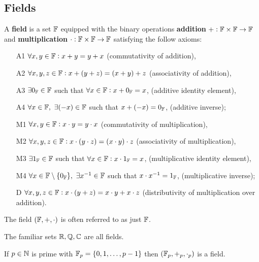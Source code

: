 \subsection{Fields}
\begin{definition}[Field]
    A \textbf{field} is a set $\mathbb{F}$ equipped with the binary operations \textbf{addition} $+:\mathbb{F}\times\mathbb{F}\rightarrow\mathbb{F}$ and \textbf{multiplication} $\cdot:\mathbb{F}\times\mathbb{F}\rightarrow\mathbb{F}$ satisfying the follow axioms:
    \begin{enumerate}
        \item[A1] $\forall x,y \in \mathbb{F}: x+y=y+x$ (commutativity of addition),
        \item[A2] $\forall x,y,z \in \mathbb{F}: x+(y+z)=(x+y)+z$ (associativity of addition),
        \item[A3] $\exists 0_{\mathbb{F}} \in \mathbb{F}$ such that $\forall x\in\mathbb{F}: x + 0_{\mathbb{F}} = x$, (additive identity element),
        \item[A4] $\forall x\in\mathbb{F}, \ \exists (-x)\in\mathbb{F}$ such that $x+(-x)=0_{\mathbb{F}}$, (additive inverse);
        
        \item[M1] $\forall x,y \in \mathbb{F}: x\cdot y=y\cdot x$ (commutativity of multiplication),
        \item[M2] $\forall x,y,z \in \mathbb{F}: x\cdot (y\cdot z)=(x\cdot y)\cdot z$ (associativity of multiplication),
        \item[M3] $\exists 1_{\mathbb{F}} \in \mathbb{F}$ such that $\forall x\in\mathbb{F}: x \cdot  1_{\mathbb{F}} = x$, (multiplicative identity element),
        \item[M4] $\forall x\in\mathbb{F}\setminus\{0_{\mathbb{F}}\}, \ \exists x^{-1}\in\mathbb{F}$ such that $x\cdot x^{-1}=1_{\mathbb{F}}$, (multiplicative inverse);

        \item[D] $\forall x,y,z \in \mathbb{F}: x\cdot(y+z)=x\cdot y+x\cdot z$ (distributivity of multiplication over addition).
    \end{enumerate}
    The field $(\mathbb{F},+,\cdot)$ is often referred to as just $\mathbb{F}$.
\end{definition}

\begin{example}
    The familiar sets $\mathbb{R}, \mathbb{Q}, \mathbb{C}$ are all fields.
\end{example}

\begin{theorem}
    If $p\in\mathbb{N}$ is prime with $\mathbb{F}_p = \{0,1,\ldots,p-1\}$ then $(\mathbb{F}_p,+_p,\cdot_p)$ is a field.
\end{theorem}

